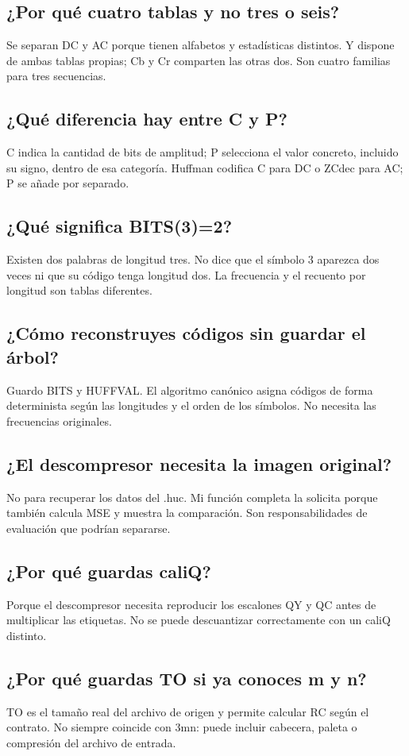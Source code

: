 \documentclass[11pt,a4paper,oneside]{report}
\begin{document}
\subsection{¿Por qué cuatro tablas y no tres o seis?}
Se separan DC y AC porque tienen alfabetos y estadísticas distintos. Y dispone de ambas tablas propias; Cb y Cr comparten las otras dos. Son cuatro familias para tres secuencias.

\subsection{¿Qué diferencia hay entre C y P?}
C indica la cantidad de bits de amplitud; P selecciona el valor concreto, incluido su signo, dentro de esa categoría. Huffman codifica C para DC o ZCdec para AC; P se añade por separado.

\subsection{¿Qué significa BITS(3)=2?}
Existen dos palabras de longitud tres. No dice que el símbolo 3 aparezca dos veces ni que su código tenga longitud dos. La frecuencia y el recuento por longitud son tablas diferentes.

\subsection{¿Cómo reconstruyes códigos sin guardar el árbol?}
Guardo BITS y HUFFVAL. El algoritmo canónico asigna códigos de forma determinista según las longitudes y el orden de los símbolos. No necesita las frecuencias originales.

\subsection{¿El descompresor necesita la imagen original?}
No para recuperar los datos del .huc. Mi función completa la solicita porque también calcula MSE y muestra la comparación. Son responsabilidades de evaluación que podrían separarse.

\subsection{¿Por qué guardas caliQ?}
Porque el descompresor necesita reproducir los escalones QY y QC antes de multiplicar las etiquetas. No se puede descuantizar correctamente con un caliQ distinto.

\subsection{¿Por qué guardas TO si ya conoces m y n?}
TO es el tamaño real del archivo de origen y permite calcular RC según el contrato. No siempre coincide con 3mn: puede incluir cabecera, paleta o compresión del archivo de entrada.
\end{document}
